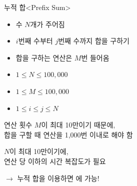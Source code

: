 \begin{frame}{누적 합}{<Prefix Sum>}
  \begin{center}
  \end{center}
  \vspace{2mm}
  \begin{twocol}
    \begin{itemize}
      \item 수 $N$개가 주어짐
      \item $i$번째 수부터 $j$번째 수까지 합을 구하기
      \item 합을 구하는 연산은 $M$번 들어옴
    \end{itemize}
    \vspace{3mm}
    \begin{itemize}
      \item $1 \le N \le 100{,}000$
      \item $1 \le M \le 100{,}000$
      \item $1 \le i \le j \le N$
    \end{itemize}
  \colsplit
    연산 횟수 $M$이 최대 10만이기 때문에,\\
    합을 구할 때 연산을 1,000번 이내로 해야 함
    \vspace{4mm}

    $N$이 최대 10만이기에,\\
    연산 당  이하의 시간 복잡도가 필요
    \vspace{4mm}

    $\to$ 누적 합을 이용하면 에 가능!
  \end{twocol}
\end{frame}

